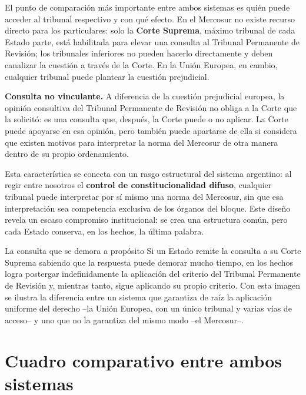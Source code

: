 \documentclass[12pt,oneside]{book}
\begin{document}
El punto de comparación más importante entre ambos sistemas es quién puede acceder al tribunal respectivo y con qué efecto. En el Mercosur no existe recurso directo para los particulares: solo la \textbf{Corte Suprema}, máximo tribunal de cada Estado parte, está habilitada para elevar una consulta al Tribunal Permanente de Revisión; los tribunales inferiores no pueden hacerlo directamente y deben canalizar la cuestión a través de la Corte. En la Unión Europea, en cambio, cualquier tribunal puede plantear la cuestión prejudicial.

\begin{importante}
\textbf{Consulta no vinculante.} A diferencia de la cuestión prejudicial europea, la opinión consultiva del Tribunal Permanente de Revisión no obliga a la Corte que la solicitó: es una consulta que, después, la Corte puede o no aplicar. La Corte puede apoyarse en esa opinión, pero también puede apartarse de ella si considera que existen motivos para interpretar la norma del Mercosur de otra manera dentro de su propio ordenamiento.
\end{importante}

Esta característica se conecta con un rasgo estructural del sistema argentino: al regir entre nosotros el \textbf{control de constitucionalidad difuso}, cualquier tribunal puede interpretar por sí mismo una norma del Mercosur, sin que esa interpretación sea competencia exclusiva de los órganos del bloque. Este diseño revela un escaso compromiso institucional: se crea una estructura común, pero cada Estado conserva, en los hechos, la última palabra.

\begin{ejemplo}{La consulta que se demora a propósito}
Si un Estado remite la consulta a su Corte Suprema sabiendo que la respuesta puede demorar mucho tiempo, en los hechos logra postergar indefinidamente la aplicación del criterio del Tribunal Permanente de Revisión y, mientras tanto, sigue aplicando su propio criterio. Con esta imagen se ilustra la diferencia entre un sistema que garantiza de raíz la aplicación uniforme del derecho --la Unión Europea, con un único tribunal y varias vías de acceso-- y uno que no la garantiza del mismo modo --el Mercosur--.
\end{ejemplo}

\section{Cuadro comparativo entre ambos sistemas}
\end{document}
